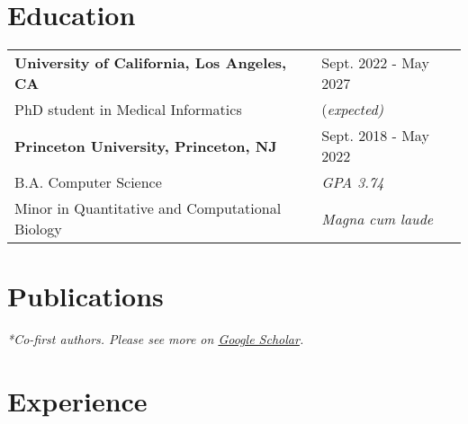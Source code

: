 \documentclass[a4paper,12pt]{article}
\begin{document}
\section{Education}
\begin{tabularx}{\linewidth}{@{}l X@{}}	
\textbf{University of California, Los Angeles, CA} &\hfill \normalsize Sept. 2022 - May 2027 \\
PhD student in Medical Informatics&\hfill \normalsize (\textit{expected)} \\

\textbf{Princeton University, Princeton, NJ} &\hfill Sept. 2018 - May 2022 \\ 

B.A. Computer Science& \hfill  \textit{GPA 3.74} \\

 Minor in Quantitative and Computational Biology  & \hfill  \textit{Magna cum laude} \\
\end{tabularx}



\section{Publications}
\begin{refsection}
\nocite{*}
\printbibliography[heading=none]
\end{refsection}
\textit{*Co-first authors. Please see more on \href{https://scholar.google.com/citations?user=xUyQJkcAAAAJ&hl=en}{Google Scholar}.}



\section{Experience}
\end{document}

